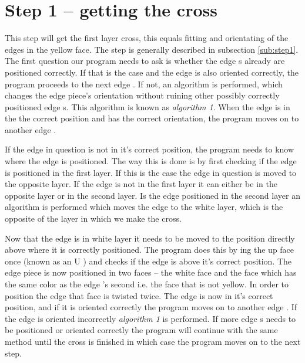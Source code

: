 \section{Step 1 -- getting the cross}
This step will get the first layer cross, this equals fitting and orientating of the edges in the yellow face. 
The step is generally described in subsection \ref{sub:step1}.
The first question our program needs to ask is whether the edge \cpiece{}s already are positioned correctly. If that is the case and the edge \cpiece{} is also oriented correctly, the program proceeds to the next edge \cpiece{}. If not, an algorithm is performed, which changes the edge piece's orientation without ruining other possibly correctly positioned edge \cpiece{}s. 
This algorithm is known as \textit{algorithm 1}. When the edge \cpiece{} is in the the correct position and has the correct orientation, the program moves on to another edge \cpiece{}. 

If the edge \cpiece{} in question is not in it's correct position, the program needs to know where the edge is positioned. 
The way this is done is by first checking if the edge \cpiece{} is positioned in the first layer. 
If this is the case the edge \cpiece{} in question is moved to the opposite layer. 
If the edge \cpiece{} is not in the first layer it can either be in the opposite layer or in the second layer.
Is the edge \cpiece{}  positioned in the second layer an algorithm is performed which moves the edge \cpiece{}  to the white layer, which is the opposite of the layer in which we make the cross.

Now that the edge \cpiece{}  is in white layer it needs to be moved to the position directly above where it is correctly positioned. 
The program does this by \twist{}ing the up face once (known as an U \twist{}) and checks if the edge \cpiece{} is above it's correct position.
The edge piece is now positioned in two faces -- the white face and the face which has the same color as the edge  \cpiece{}'s second \facelet{} i.e. the face that is not yellow.
In order to position the edge \cpiece{} that face is twisted twice.
The edge \cpiece{}  is now in it's correct position, and if it is oriented correctly the program moves on to another edge  \cpiece{} .
If the edge \cpiece{} is oriented incorrectly \textit{algorithm 1} is performed. If more edge  \cpiece{}s needs to be positioned or oriented correctly the program will continue with the same method until the cross is finished in which case the program moves on to the next step.

